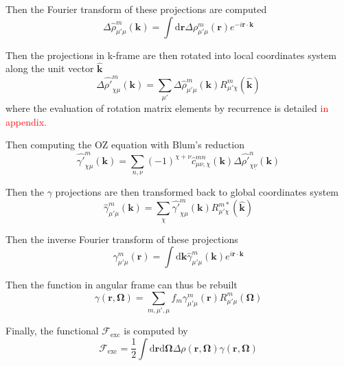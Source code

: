 Then the Fourier transform of these projections are computed
\begin{equation}
\Delta\hat{\rho}_{\mu'\mu}^{m}(\mathbf{k})=\int\mathrm{d}\mathbf{r}\Delta\rho_{\mu'\mu}^{m}(\mathbf{r})e^{-i\mathbf{r}\cdot\mathbf{k}}\label{eq:fft3d-fwd}
\end{equation}


Then the projections in k-frame are then rotated into local coordinates
system along the unit vector $\mathbf{\hat{k}}$
\begin{equation}
\Delta\hat{\rho'}_{\chi\mu}^{m}(\mathbf{k})=\sum_{\mu'}\Delta\hat{\rho}_{\mu'\mu}^{m}(\mathbf{k})R_{\mu'\chi}^{m}(\mathbf{\hat{k}})
\end{equation}
where the evaluation of rotation matrix elements by recurrence is
detailed \textcolor{red}{in appendix.}

Then computing the OZ equation with Blum's reduction
\begin{equation}
\hat{\gamma'}_{\chi\mu}^{m}(\mathbf{k})=\sum_{n,\nu}(-1)^{\chi+\nu}\hat{c}_{\mu\nu,\chi}^{mn}(\mathbf{k})\Delta\hat{\rho'}_{\chi\underline{\nu}}^{n}(\mathbf{k})\label{eq:OZ-2}
\end{equation}


Then the $\gamma$ projections are then transformed back to global
coordinates system
\begin{equation}
\hat{\gamma}_{\mu'\mu}^{m}(\mathbf{k})=\sum_{\chi}\hat{\gamma'}_{\chi\mu}^{m}(\mathbf{k})R_{\mu'\chi}^{m*}(\mathbf{\hat{k}})
\end{equation}


Then the inverse Fourier transform of these projections
\begin{equation}
\gamma_{\mu'\mu}^{m}(\mathbf{r})=\int\mathrm{d}\mathbf{k}\hat{\gamma}_{\mu'\mu}^{m}(\mathbf{k})e^{i\mathbf{r}\cdot\mathbf{k}}
\end{equation}


Then the function in angular frame can thus be rebuilt
\begin{equation}
\gamma(\mathbf{r},\mathbf{\Omega})=\sum_{m,\mu',\mu}f_{m}\gamma_{\mu'\mu}^{m}(\mathbf{r})R_{\mu'\mu}^{m}(\mathbf{\Omega})\label{eq:fgsht-bwd}
\end{equation}


Finally, the functional $\mathcal{F}_{\mathrm{exc}}$ is computed
by
\begin{equation}
\mathcal{F}_{\mathrm{exc}}=\frac{1}{2}\int\mathrm{d}\mathbf{r}\mathrm{d}\mathbf{\Omega}\Delta\rho(\mathbf{r},\mathbf{\Omega})\gamma(\mathbf{r},\mathbf{\Omega})
\end{equation}



